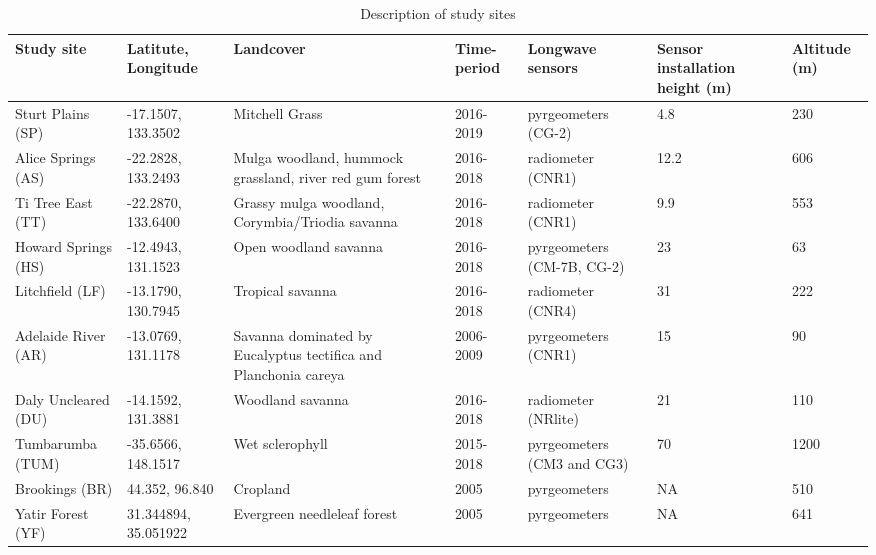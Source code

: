 \documentclass[fleqn,10pt]{wlscirep}
\begin{document}
\begin{table}[h!]
\centering
\caption{Description of study sites}
\begin{tabular}{|p{2.5cm}|p{1.5cm}|p{2.2cm}|p{1.5cm}|p{2.5cm}|p{1cm}|p{1cm}|}
 \hline
 \textbf{Study site} &\textbf{Latitute, Longitude} & \textbf{Landcover} & \textbf{Time-period} 
 & \textbf{Longwave sensors} & \textbf{Sensor installation height (m)} & \textbf{Altitude (m)} \\
 \hline 
 Sturt Plains (SP) &  -17.1507, 133.3502 & Mitchell Grass & 2016-2019 & pyrgeometers (CG-2) & 4.8 & 230\\ 
 \hline
 Alice Springs (AS) &  -22.2828, 133.2493 &  Mulga woodland, hummock grassland, river red gum forest & 2016-2018 & radiometer (CNR1) & 12.2 & 606\\ 
 \hline 
 Ti Tree East (TT) &  -22.2870, 133.6400 & Grassy mulga woodland, Corymbia/Triodia savanna & 2016-2018 & radiometer (CNR1) & 9.9 & 553  \\
 \hline
 Howard Springs (HS) &  -12.4943, 131.1523 & Open woodland savanna & 2016-2018 & pyrgeometers (CM-7B, CG-2) & 23 & 63\\
 \hline
 Litchfield (LF) &  -13.1790, 130.7945 & Tropical savanna & 2016-2018 & radiometer (CNR4) & 31 & 222 \\
 \hline
 Adelaide River (AR) & -13.0769, 131.1178 & Savanna dominated by Eucalyptus tectifica and Planchonia careya & 2006-2009 & pyrgeometers   (CNR1) & 15 & 90\\
 \hline
Daly Uncleared (DU) & -14.1592, 131.3881 & Woodland savanna & 2016-2018 & radiometer (NRlite) & 21 & 110 \\
 \hline
 Tumbarumba (TUM) & -35.6566, 148.1517 & Wet sclerophyll & 2015-2018 & pyrgeometers (CM3 and CG3) & 70 & 1200 \\
 \hline
Brookings (BR) & 44.352, 96.840 & Cropland & 2005 & pyrgeometers\cite{guillevic2017land}& NA & 510\cite{wang2008validating}
 \\
 \hline 
 Yatir Forest (YF) & 31.344894, 35.051922 & Evergreen needleleaf forest & 2005 & pyrgeometers\cite{guillevic2017land}
 & NA & 641\\
 \hline 
\end{tabular}
\label{table:studysites}
\end{table}
\end{document}
